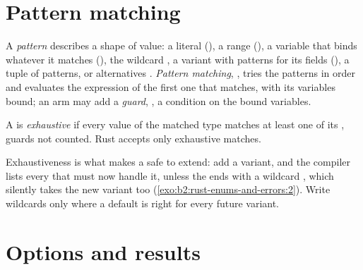 \section{Pattern matching}\label{sec:b2:rust-enums-and-errors:match}

\begin{definition}\label{def:b2:rust-enums-and-errors:matching}
A \emph{pattern} describes a shape of value: a literal (), a range (), a variable
that binds whatever it matches (), the wildcard \code{_}, a variant with patterns for its fields
(), a tuple of patterns, or alternatives . \emph{Pattern
matching}, , tries the patterns in order and
evaluates the expression of the first one that matches, with its variables bound; an arm may add a \emph{guard},
, a condition on the bound variables.
\end{definition}

\begin{definition}\label{def:b2:rust-enums-and-errors:exhaustive}
A  is \emph{exhaustive} if every value of the matched type matches at least one of
its , guards not counted. Rust accepts only exhaustive matches.
\end{definition}

\label{lst:b2:rust-enums-and-errors:nonexhaustive}

\label{out:b2:rust-enums-and-errors:nonexhaustive}

Exhaustiveness is what makes a  safe to extend: add a variant, and the compiler lists every  that
must now handle it, unless the  ends with a wildcard \code{_}, which silently takes the new variant too
(\cref{exo:b2:rust-enums-and-errors:2}). Write wildcards only where a default is right for every future variant.

\section{Options and results}\label{sec:b2:rust-enums-and-errors:errors}

